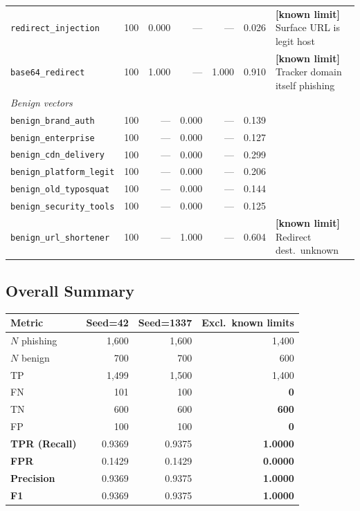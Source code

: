 \documentclass[11pt,a4paper]{article}
\newcommand{\code}[1]{\texttt{#1}}
\begin{document}
\begin{table}[h]
\begin{tabular}{lrrrrrp{4.5cm}}
\code{redirect\_injection}  & 100 & 0.000 & --- & ---   & 0.026 &
  \textbf{[known limit]} Surface URL is legit host \\
\code{base64\_redirect}     & 100 & 1.000 & --- & 1.000 & 0.910 &
  \textbf{[known limit]} Tracker domain itself phishing \\
\midrule
\multicolumn{7}{l}{\textit{Benign vectors}} \\
\code{benign\_brand\_auth}     & 100 & --- & 0.000 & --- & 0.139 & \\
\code{benign\_enterprise}      & 100 & --- & 0.000 & --- & 0.127 & \\
\code{benign\_cdn\_delivery}   & 100 & --- & 0.000 & --- & 0.299 & \\
\code{benign\_platform\_legit} & 100 & --- & 0.000 & --- & 0.206 & \\
\code{benign\_old\_typosquat}  & 100 & --- & 0.000 & --- & 0.144 & \\
\code{benign\_security\_tools} & 100 & --- & 0.000 & --- & 0.125 & \\
\code{benign\_url\_shortener}  & 100 & --- & 1.000 & --- & 0.604 &
  \textbf{[known limit]} Redirect dest.\ unknown \\
\bottomrule
\end{tabular}
\end{table}

\subsection{Overall Summary}

\begin{table}[h]
\centering
\begin{tabular}{lrrr}
\toprule
Metric & Seed=42 & Seed=1337 & Excl.\ known limits \\
\midrule
$N$ phishing & 1,600 & 1,600 & 1,400 \\
$N$ benign   & 700   & 700   & 600   \\
TP           & 1,499 & 1,500 & 1,400 \\
FN           & 101   & 100   & \textbf{0} \\
TN           & 600   & 600   & \textbf{600} \\
FP           & 100   & 100   & \textbf{0} \\
\textbf{TPR (Recall)}  & 0.9369 & 0.9375 & \textbf{1.0000} \\
\textbf{FPR}           & 0.1429 & 0.1429 & \textbf{0.0000} \\
\textbf{Precision}     & 0.9369 & 0.9375 & \textbf{1.0000} \\
\textbf{F1}            & 0.9369 & 0.9375 & \textbf{1.0000} \\
\bottomrule
\end{tabular}
\end{table}
\end{document}
